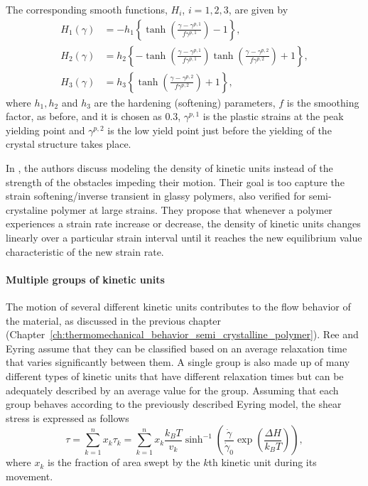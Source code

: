 The corresponding smooth functions, $H_i$, $i=1,2,3$, are given by
\begin{align}
	H_1(\gamma)&=-h_1\left\{\tanh \left(\frac{\gamma-\gamma^{p,1}}{f \gamma^{p,1}}\right)-1\right\}, \\
	H_2(\gamma)&=h_2\left\{-\tanh \left(\frac{\gamma-\gamma^{p,1}}{f \gamma^{p,1}}\right) \tanh \left(\frac{\gamma-\gamma^{p,2}}{f \gamma^{p,2}}\right)+1\right\}, \\
	H_3(\gamma)&=h_3\left\{\tanh \left(\frac{\gamma-\gamma^{p,2}}{f \gamma^{p,2}}\right)+1\right\},
\end{align}
where $h_1, h_2$ and $h_3$ are the hardening (softening) parameters, $f$ is the smoothing factor, as before, and it is chosen as $0.3$, $\gamma^{p,1}$ is the plastic strains at the peak yielding point and $\gamma^{p,2}$ is the low yield point just before the yielding of the crystal structure takes place.


In \cite{gsellYieldTransientEffects1981}, the authors discuss modeling the density of kinetic units instead of the strength of the obstacles impeding their motion.
Their goal is too capture the strain softening/inverse transient in glassy polymers, also verified for semi-crystaline polymer at large strains.
They propose that whenever a polymer experiences a strain rate increase or decrease, the density of kinetic units changes linearly over a particular strain interval until it reaches the new equilibrium value characteristic of the new strain rate.

\paragraph{Multiple groups of kinetic units}

The motion of several different kinetic units contributes to the flow behavior of the material, as discussed in the previous chapter (Chapter~\ref{ch:thermomechanical_behavior_semi_crystalline_polymer}).
Ree and Eyring \citep{reeTheoryNonNewtonian1955} assume that they can be classified based on an average relaxation time that varies significantly between them.
A single group is also made up of many different types of kinetic units that have different relaxation times but can be adequately described by an average value for the group.
Assuming that each group behaves according to the previously described Eyring model, the shear stress is expressed as follows
\begin{equation}
	\tau=\sum_{k=1}^n x_k \tau_k = \sum_{k=1}^n x_k\frac{k_B T}{v_k} \sinh^{-1}\left(\frac{\dot\gamma}{\dot\gamma_0}\exp\left(\frac{\Delta H}{k_B T}\right)\right),
\end{equation}
where $x_k$ is the fraction of area swept by the $k$th kinetic unit during its movement.

